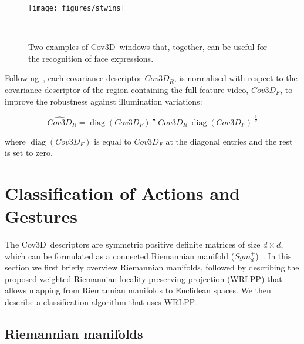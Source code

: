 \documentclass[10pt,twocolumn,letterpaper]{article}
\newcommand{\eqsize}{\footnotesize}
\newcommand{\cov}{{Cov3D}}
\begin{document}
\begin{figure}[!b]
  \centering
  \begin{minipage}{1\columnwidth}
    \begin{minipage}{0.4\columnwidth}
      \texttt{[image: figures/stwins]}
    \end{minipage}
    \hfill
    \begin{minipage}{0.55\columnwidth}
      \caption
        {
        \small
        Two examples of \cov~windows that, together, can be useful for the recognition of face expressions.
        }
      \label{fig:stwins}
      ~
    \end{minipage}
  \end{minipage}
\end{figure}

Following~\cite{TuzelEtAl2008}, each covariance descriptor {\eqsize $\cov_R$},
is normalised with respect to the covariance descriptor of the region containing the full feature video, {\eqsize $\cov_F$},
to improve the robustness against illumination variations:


\noindent
\eqsize
\begin{equation}
  \widehat{\cov}_R = \operatorname{diag}(\cov_F)^{ \mbox{-} \frac{1}{2}} ~ \cov_R ~ \operatorname{diag}(\cov_F)^{ \mbox{-} \frac{1}{2}}
\end{equation}
\normalsize

\noindent
where {\small $\operatorname{diag}(\cov_F)$} is equal to {\small $\cov_F$} at the diagonal entries and the rest is set to zero.
\section{Classification of Actions and Gestures}
\label{sec:method}

The \cov~descriptors are symmetric positive definite matrices of size \mbox{\eqsize $d \times d$},
which can be formulated as a connected Riemannian manifold ({\eqsize $Sym_d^+$})~\cite{harandi_eccv_2012}.
In this section we first briefly overview Riemannian manifolds,
followed by describing the proposed weighted Riemannian locality preserving projection (WRLPP)
that allows mapping from Riemannian manifolds to Euclidean spaces.
We then describe a classification algorithm that uses WRLPP.



\subsection{Riemannian manifolds}
\label{sec:manifolds}
\end{document}

